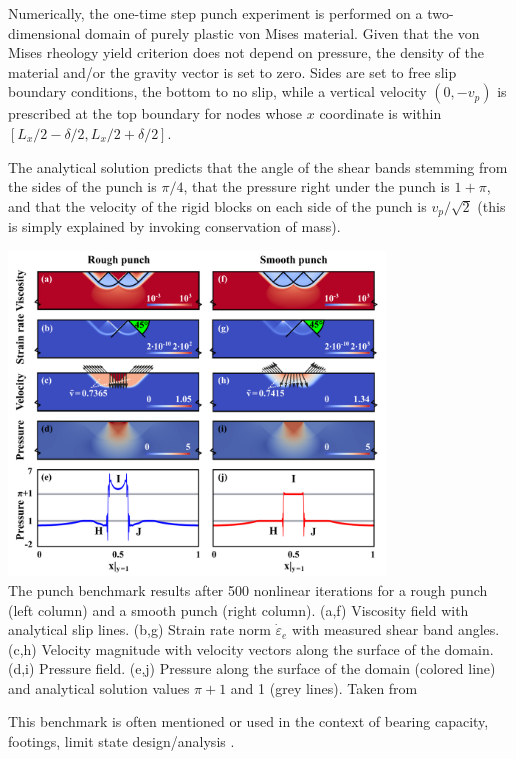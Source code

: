 

 
Numerically, the one-time step punch experiment is performed on a two-dimensional
domain of purely plastic von Mises material. 
Given that the von Mises rheology yield criterion does not depend on pressure, the density of the material and/or the gravity vector is set to zero. Sides are set to free slip boundary conditions, the bottom to no slip, while a vertical velocity $(0,-v_p)$ is prescribed at the top boundary for nodes whose $x$ coordinate is within $[L_x/2-\delta/2,L_x/2+\delta/2]$. 

The analytical solution predicts that the angle of the shear bands stemming from the sides of the punch 
is $\pi/4$, that the pressure right under the punch is $1+\pi$, 
and that the velocity of the rigid blocks on each side of the punch is $v_p/\sqrt{2}$ 
(this is simply explained by invoking conservation of mass).


\begin{center}
\includegraphics[width=10cm]{images/benchmark_punch/gltf18}\\
{\captionfont The punch benchmark results after 500 nonlinear iterations for a rough punch (left column) 
and a smooth punch (right column). (a,f) Viscosity field with analytical slip lines. 
(b,g) Strain rate norm $\dot\varepsilon_e$ with measured shear band angles. 
(c,h) Velocity magnitude with velocity vectors along the surface of the domain.
(d,i) Pressure field. (e,j) Pressure along the surface of the domain (colored line) and analytical 
solution values $\pi + 1$ and 1 (grey lines). Taken from \cite{gltf18}}
\end{center}

\begin{remark}
This benchmark is often mentioned or used in the context of bearing capacity, footings, 
limit state design/analysis \cite{mich01,zhll03,gour04,gork06,lesk05,shls03}.
\end{remark}


